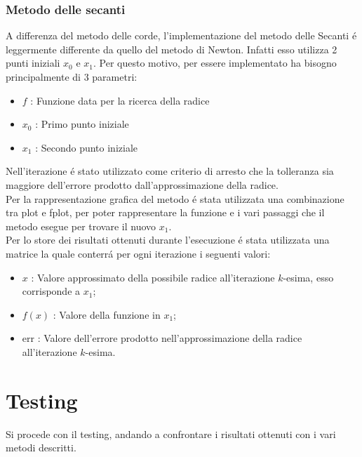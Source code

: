 \documentclass[12pt, letterpaper]{article}
\begin{document}
\subsubsection{Metodo delle secanti}
A differenza del metodo delle corde, l'implementazione del metodo delle Secanti \'e leggermente differente da quello del metodo di Newton.
Infatti esso utilizza 2 punti iniziali $x_0$ e $x_1$.
Per questo motivo, per essere implementato ha bisogno principalmente di $3$ parametri:
\begin{itemize}
    \item $f$ : Funzione data per la ricerca della radice
    \item $x_0$ : Primo punto iniziale 
    \item $x_1$ : Secondo punto iniziale
\end{itemize}
Nell'iterazione \'e stato utilizzato come criterio di arresto che la tolleranza sia maggiore dell'errore prodotto dall'approssimazione della radice. \\
Per la rappresentazione grafica del metodo \'e stata utilizzata una combinazione tra plot e fplot, per poter rappresentare la funzione e i vari passaggi che il metodo esegue per trovare il nuovo $x_1$. \\
Per lo store dei risultati ottenuti durante l'esecuzione \'e stata utilizzata una matrice la quale conterr\'a per ogni iterazione i seguenti valori:
\begin{itemize}
    \item $x$    : Valore approssimato della possibile radice all'iterazione $k$-esima, esso corrisponde a $x_1$;
    \item $f(x)$ : Valore della funzione in $x_1$;
    \item err   : Valore dell'errore prodotto nell'approssimazione della radice all'iterazione $k$-esima.
\end{itemize} 

\newpage

\section{Testing}
Si procede con il testing, andando a confrontare i risultati ottenuti con i vari metodi descritti.
\end{document}
